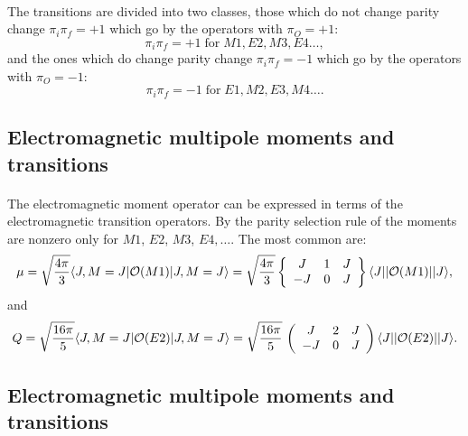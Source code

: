 \documentclass[%
oneside,                 %
final,                   %
10pt]{article}
\begin{document}
\paragraph{}
The transitions are divided into two classes, those
which do not change parity change $\pi _{i}\pi _{f}=+1$ which go by the
operators with $\pi _{O}=+1$:
\[
\pi _{i}\pi _{f}=+1 \; \mathrm{for} \; M1, E2, M3, E4 \dots,
\]
and the ones which do change parity change $\pi _{i}\pi _{f}=-1$
which go by the operators with $\pi _{O}=-1$:
\[
\pi _{i}\pi _{f}=-1 \; \mathrm{for} \; E1, M2, E3, M4 \dots.
\]



\subsection{Electromagnetic multipole moments and transitions}

\paragraph{}
The 
electromagnetic moment operator can be expressed in terms of the
electromagnetic transition operators.
By the parity selection rule of the moments are nonzero
only for $M1$, $E2$, $M3$, $E4,\ldots$.
The most common are:
\[
\mu =\sqrt{\frac{4\pi }{3}}\langle J,M=J\vert {\cal O}(M1)\vert J,M=J\rangle= \sqrt{\frac{4\pi }{3}}\left\{\begin{array}{ccc} J & 1 &J \\  -J &  0 &  J \end{array}\right\}
\langle J\vert \vert {\cal O}(M1)\vert \vert J\rangle,
\]
and
\[
Q = \sqrt{\frac{16\pi }{5}}\langle J,M=J\vert {\cal O}(E2)\vert J,M=J\rangle= \sqrt{\frac{16\pi }{5}}\,
  \left(\begin{array}{ccc}  {J}&  {2} & {J}\\  {-J} & {0}&  {J}\end{array}\right)\langle J\vert\vert {\cal O}(E2)\vert\vert J\rangle.
\]



\subsection{Electromagnetic multipole moments and transitions}

\end{document}
